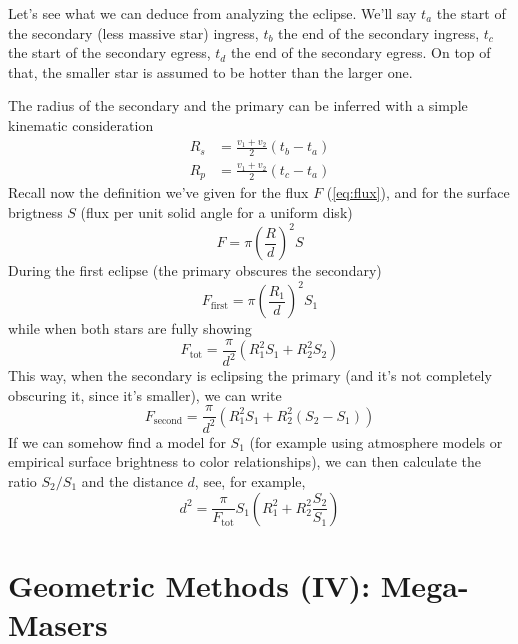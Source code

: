 \par Let's see what we can deduce from analyzing the eclipse. We'll say $t_{a}$ the start of the secondary (less massive star) ingress, $t_{b}$ the end of the secondary ingress, $t_{c}$ the start of the secondary egress, $t_{d}$ the end of the secondary egress. On top of that, the smaller star is assumed to be hotter than the larger one.
\par The radius of the secondary and the primary can be inferred with a simple kinematic consideration 
\begin{align*}
    R_{s} &= \frac{v_{1}+v_{2}}{2}(t_{b}-t_{a})\\
    R_{p} &= \frac{v_{1}+v_{2}}{2}(t_{c}-t_{a})
\end{align*}
Recall now the definition we've given for the flux $F$ (\ref{eq:flux}), and for the surface brigtness $S$ (flux per unit solid angle for a uniform disk)
\begin{equation*}
    F = \pi\left(\frac{R}{d}\right)^{2}S
\end{equation*}
During the first eclipse (the primary obscures the secondary)
\begin{equation*}
    F_{\text{first}} = \pi\left(\frac{R_{1}}{d}\right)^{2}S_{1}
\end{equation*}
while when both stars are fully showing 
\begin{equation*}
    F_{\text{tot}} = \frac{\pi}{d^{2}}(R_{1}^{2}S_{1}+R_{2}^{2}S_{2})
\end{equation*}
This way, when the secondary is eclipsing the primary (and it's not completely obscuring it, since it's smaller), we can write
\begin{equation*}
    F_{\text{second}} = \frac{\pi}{d^{2}}(R_{1}^{2}S_{1}+R_{2}^{2}(S_{2}-S_{1}))
\end{equation*}
If we can somehow find a model for $S_{1}$ (for example using atmosphere models or empirical surface brightness to color relationships), we can then calculate the ratio $S_{2}/S_{1}$ and the distance $d$, see, for example, \cite{2013Natur.495...76P}
\begin{equation}
    d^{2} = \frac{\pi}{F_{\text{tot}}}S_{1}\left(R_{1}^{2}+R_{2}^{2}\frac{S_{2}}{S_{1}}\right)
    \label{eq:eclipsingdistance}
\end{equation}

\section{Geometric Methods (IV): Mega-Masers}

